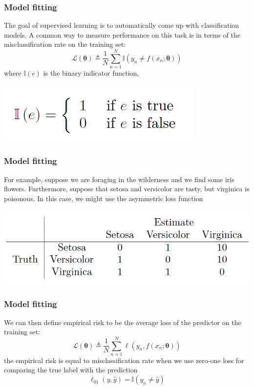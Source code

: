 \documentclass[spanish]{beamer}
\begin{document}
\begin{frame}
\frametitle{Model fitting}
The goal of supervised learning is to automatically come up with classification models. A common way to
measure performance on this task is in terms of the misclassification rate on the training set:
\begin{equation*}
\mathcal{L}(\mathbf{\theta}) \triangleq \frac{1}{N} \sum_{n=1}^{N}{\mathbb{I}(y_{n}\neq f(x_{n};\mathbf{\theta})) }
\end{equation*}
where $\mathbb{I}(e)$ is the binary indicator function,
\begin{center}
\includegraphics[scale=0.5]{im8}
\end{center}
\end{frame}
\begin{frame}
\frametitle{Model fitting}
For example, suppose we are foraging in the wilderness and we find some iris flowers.
Furthermore, suppose that setosa and versicolor are tasty, but virginica is poisonous. In this case, we
might use the asymmetric loss function
\begin{center}
\includegraphics[scale=0.4]{im9}
\end{center}
\end{frame}
\begin{frame}
\frametitle{Model fitting}
We can then define empirical risk to be the average loss of the predictor on the training set:
\begin{equation*}
\mathcal{L}(\mathbf{\theta}) \triangleq \frac{1}{N} \sum_{n=1}^{N}{\ell(y_{n}, f(x_{n};\mathbf{\theta})) }
\end{equation*}
the empirical risk is equal to misclassification rate when we use zero-one loss for comparing the true label with the prediction
\begin{equation*}
\ell_{01}(y,\hat{y})= \mathbb{I}(y_{n}\neq \hat{y}) 
\end{equation*} 

\end{frame}
\end{document}
